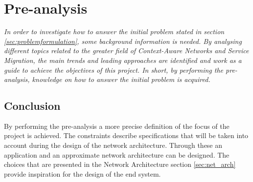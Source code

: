 \chapter{Pre-analysis}
\label{sec:preanalysis}

\textit{In order to investigate how to answer the initial problem stated in section \ref{sec:problemformulation}, some background information is needed. By analysing different topics related to the greater field of Context-Aware Networks and Service Migration, the main trends and leading approaches are identified and work as a guide to achieve the objectives of this project. In short, by performing the pre-analysis, knowledge on how to answer the initial problem is acquired.}


%
% 

\section{Conclusion}
By performing the pre-analysis a more precise definition of the focus of the project is achieved. The constraints describe specifications that will be taken into account during the design of the network architecture. Through these an application and an approximate network architecture can be designed. The choices that are presented in the Network Architecture section \ref{sec:net_arch} provide inspiration for the design of the end system.